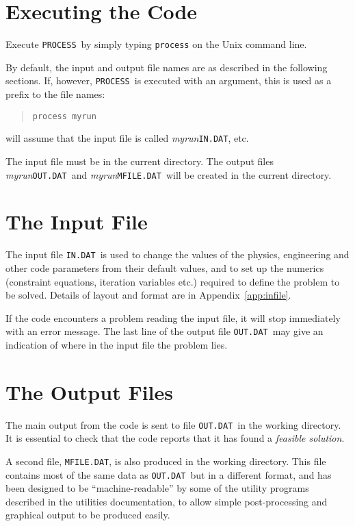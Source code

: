 \documentclass[11pt,a4paper]{report}
\newcommand{\indat}{\mbox{\texttt{IN.DAT}}}
\newcommand{\mfile}{\mbox{\texttt{MFILE.DAT}}}
\newcommand{\outdat}{\mbox{\texttt{OUT.DAT}}}
\newcommand{\process}{\mbox{\texttt{PROCESS}}}
\begin{document}
\section{Executing the Code}

Execute \process\ by simply typing \texttt{process} on the Unix command line.

By default, the input and output file names are as described in the following
sections. If, however, \process\ is executed with an argument, this is used as
a prefix to the file names:
\begin{quote}
\begin{verbatim}
process myrun
\end{verbatim}
\end{quote}
will assume that the input file is called \textit{myrun}\indat, etc.

The input file must be in the current directory.  The output files \textit{myrun}\outdat\
and \textit{myrun}\mfile\ will be created in the current directory.

\section{The Input File}
\label{sec:infile}

The input file \indat\ is used to change the values of the physics,
engineering and other code parameters from their default values, and to set up
the numerics (constraint equations, iteration variables etc.) required to
define the problem to be solved. Details of layout and format are in
Appendix~\ref{app:infile}.

If the code encounters a problem reading the input file, it will stop
immediately with an error message. The last line of the output file \outdat\
may give an indication of where in the input file the problem lies.

\section{The Output Files}

The main output from the code is sent to file \outdat\ in the working
directory.  It is essential to check that the code reports that it has found a
\textit{feasible solution}.

A second file, \mfile, is also produced in the working directory.  This file
contains most of the same data as \outdat\ but in a different format, and has
been designed to be ``machine-readable'' by some of the utility programs
described in the utilities documentation, to allow simple post-processing and
graphical output to be produced easily.
\end{document}
